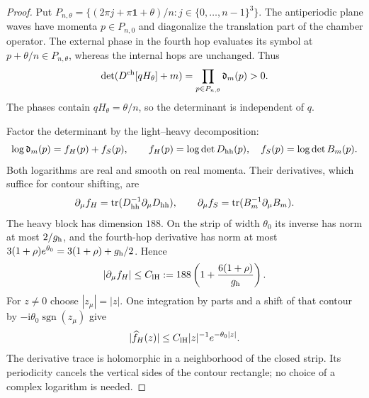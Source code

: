 \begin{proof}
Put $P_{n,\theta}=\{(2\pi j+\pi\mathbf1+\theta)/n:
j\in\{0,\ldots,n-1\}^3\}$. The antiperiodic plane waves
have momenta $p\in P_{n,0}$ and diagonalize the translation
part of the chamber operator. The external phase in the
fourth hop evaluates its symbol at $p+\theta/n\in P_{n,\theta}$,
whereas the internal hops are unchanged. Thus
\begin{equation}\label{eq:term-free-product}
 \det(D^{\rm ch}[qH_\theta]+m)
                   =\prod_{p\in P_{n,\theta}}\mathfrak d_m(p)>0.
\end{equation}
The phases contain $qH_\theta=\theta/n$, so the determinant
is independent of $q$.

Factor the determinant by the light--heavy decomposition:
\[
 \log\mathfrak d_m(p)=f_H(p)+f_S(p),\qquad
 f_H(p)=\log\det D_{\rm hh}(p),\quad
 f_S(p)=\log\det B_m(p).
\]
Both logarithms are real and smooth on real momenta.
Their derivatives, which suffice for contour shifting, are
\[
 \partial_\mu f_H=\operatorname{tr}(D_{\rm hh}^{-1}\partial_\mu D_{\rm hh}),
 \qquad
 \partial_\mu f_S=\operatorname{tr}(B_m^{-1}\partial_\mu B_m).
\]
The heavy block has dimension $188$. On the strip of
width $\theta_0$ its inverse has norm at most $2/g_{\rm h}$,
and the fourth-hop derivative has norm at most
$3(1+\rho)e^{\theta_0}=3(1+\rho)+g_{\rm h}/2$.
Hence
\[
 |\partial_\mu f_H|\le
 C_{\rm lH}:=188\left(1+\frac{6(1+\rho)}{g_{\rm h}}\right).
\]
For $z\ne0$ choose $|z_\mu|=|z|$. One integration by parts
and a shift of that contour by
$-\mathrm i\theta_0\operatorname{sgn}(z_\mu)$ give
\begin{equation}\label{eq:term-heavy-log-Fourier}
 |\widehat f_H(z)|\le C_{\rm lH}|z|^{-1}e^{-\theta_0|z|}.
\end{equation}
The derivative trace is holomorphic in a neighborhood of
the closed strip. Its periodicity cancels the vertical sides
of the contour rectangle; no choice of a complex logarithm
is needed.


\end{proof}
